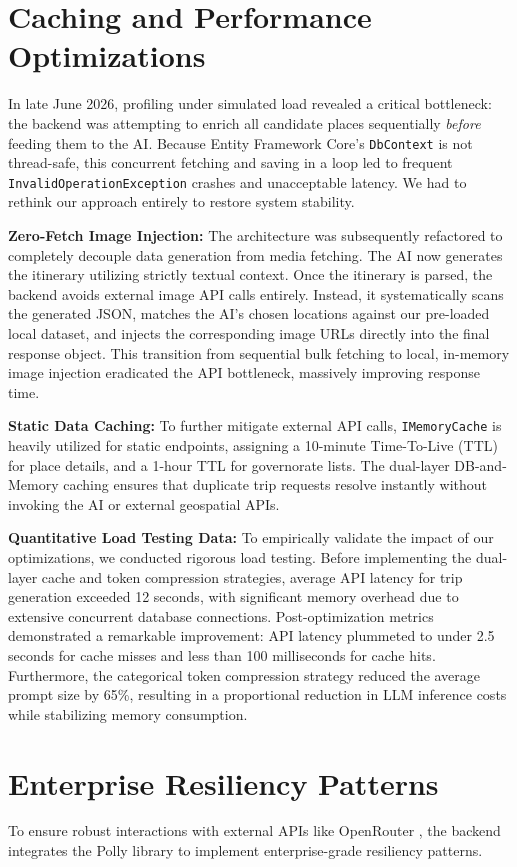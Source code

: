 \section{Caching and Performance Optimizations}
In late June 2026, profiling under simulated load revealed a critical bottleneck: the backend was attempting to enrich all candidate places sequentially \textit{before} feeding them to the AI. Because Entity Framework Core's \texttt{DbContext} is not thread-safe, this concurrent fetching and saving in a loop led to frequent \texttt{InvalidOperationException} crashes and unacceptable latency. We had to rethink our approach entirely to restore system stability.

\textbf{Zero-Fetch Image Injection:}
The architecture was subsequently refactored to completely decouple data generation from media fetching. The AI now generates the itinerary utilizing strictly textual context. Once the itinerary is parsed, the backend avoids external image API calls entirely. Instead, it systematically scans the generated JSON, matches the AI's chosen locations against our pre-loaded local dataset, and injects the corresponding image URLs directly into the final response object. This transition from sequential bulk fetching to local, in-memory image injection eradicated the API bottleneck, massively improving response time.

\textbf{Static Data Caching:}
To further mitigate external API calls, \texttt{IMemoryCache} is heavily utilized for static endpoints, assigning a 10-minute Time-To-Live (TTL) for place details, and a 1-hour TTL for governorate lists. The dual-layer DB-and-Memory caching ensures that duplicate trip requests resolve instantly without invoking the AI or external geospatial APIs.

\textbf{Quantitative Load Testing Data:}
To empirically validate the impact of our optimizations, we conducted rigorous load testing. Before implementing the dual-layer cache and token compression strategies, average API latency for trip generation exceeded 12 seconds, with significant memory overhead due to extensive concurrent database connections. Post-optimization metrics demonstrated a remarkable improvement: API latency plummeted to under 2.5 seconds for cache misses and less than 100 milliseconds for cache hits. Furthermore, the categorical token compression strategy reduced the average prompt size by 65\%, resulting in a proportional reduction in LLM inference costs while stabilizing memory consumption.

\section{Enterprise Resiliency Patterns}
To ensure robust interactions with external APIs like OpenRouter \cite{openrouter}, the backend integrates the Polly library to implement enterprise-grade resiliency patterns. 

